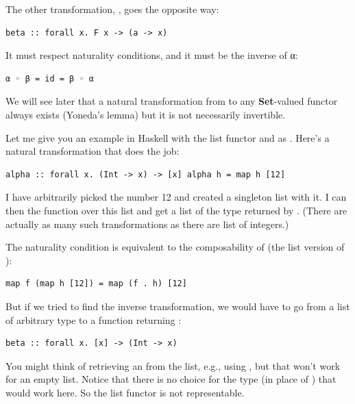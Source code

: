 The other transformation, , goes the opposite way:

\begin{Verbatim}[commandchars=\\\{\}]
beta :: forall x. F x -> (a -> x)
\end{Verbatim}

It must respect naturality conditions, and it must be the inverse of α:

\begin{Verbatim}[commandchars=\\\{\}]
α ◦ β = id = β ◦ α
\end{Verbatim}

We will see later that a natural transformation from 
to any \textbf{Set}-valued functor always exists (Yoneda's lemma) but it
is not necessarily invertible.

Let me give you an example in Haskell with the list functor and
 as . Here's a natural transformation that does
the job:

\begin{Verbatim}[commandchars=\\\{\}]
alpha :: forall x. (Int -> x) -> [x] alpha h = map h [12]
\end{Verbatim}

I have arbitrarily picked the number 12 and created a singleton list
with it. I can then  the function  over this list
and get a list of the type returned by . (There are actually
as many such transformations as there are list of integers.)

The naturality condition is equivalent to the composability of
 (the list version of ):

\begin{Verbatim}[commandchars=\\\{\}]
map f (map h [12]) = map (f . h) [12]
\end{Verbatim}

But if we tried to find the inverse transformation, we would have to go
from a list of arbitrary type  to a function returning
:

\begin{Verbatim}[commandchars=\\\{\}]
beta :: forall x. [x] -> (Int -> x)
\end{Verbatim}

You might think of retrieving an  from the list, e.g., using
, but that won't work for an empty list. Notice that there
is no choice for the type  (in place of ) that
would work here. So the list functor is not representable.


